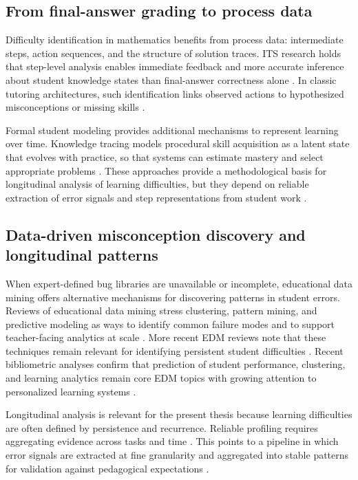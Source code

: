 \subsection{From final-answer grading to process data}
\label{sec:sota_math_process}

Difficulty identification in mathematics benefits from process data: intermediate steps, action sequences, and the structure of solution traces. ITS research holds that step-level analysis enables immediate feedback and more accurate inference about student knowledge states than final-answer correctness alone \parencite{Woolf2010,VanLehn2006}. In classic tutoring architectures, such identification links observed actions to hypothesized misconceptions or missing skills \parencite{BrownBurton1978,VanLehn1990}.

Formal student modeling provides additional mechanisms to represent learning over time. Knowledge tracing models procedural skill acquisition as a latent state that evolves with practice, so that systems can estimate mastery and select appropriate problems \parencite{CorbettAnderson1995,Piech2015}. These approaches provide a methodological basis for longitudinal analysis of learning difficulties, but they depend on reliable extraction of error signals and step representations from student work \parencite{Woolf2010,Piech2015}.

\subsection{Data-driven misconception discovery and longitudinal patterns}
\label{sec:sota_math_misconceptions}

When expert-defined bug libraries are unavailable or incomplete, educational data mining offers alternative mechanisms for discovering patterns in student errors. Reviews of educational data mining stress clustering, pattern mining, and predictive modeling as ways to identify common failure modes and to support teacher-facing analytics at scale \parencite{BakerYacef2009,RomeroVentura2010EDM}. More recent EDM reviews note that these techniques remain relevant for identifying persistent student difficulties \parencite{RomeroVentura2024}. Recent bibliometric analyses confirm that prediction of student performance, clustering, and learning analytics remain core EDM topics with growing attention to personalized learning systems \parencite{Rao2024}.

Longitudinal analysis is relevant for the present thesis because learning difficulties are often defined by persistence and recurrence. Reliable profiling requires aggregating evidence across tasks and time \parencite{BakerYacef2009,RomeroVentura2024}. This points to a pipeline in which error signals are extracted at fine granularity and aggregated into stable patterns for validation against pedagogical expectations \parencite{Woolf2010}.

